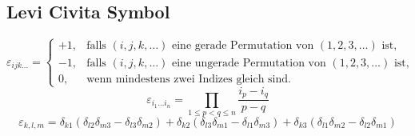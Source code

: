 \documentclass[11pt]{article}
\begin{document}
\subsection{Levi Civita Symbol}
\label{sec-13-3}
\begin{equation}
\varepsilon_{ijk \dots} =
\begin{cases}
+1, & \mbox{falls }(i,j,k,\dots) \mbox{ eine gerade Permutation von } (1,2,3,\dots) \mbox{ ist,} \\
-1, & \mbox{falls }(i,j,k,\dots) \mbox{ eine ungerade Permutation von } (1,2,3,\dots) \mbox{ ist,} \\
0,  & \mbox{wenn mindestens zwei Indizes gleich sind.}
\end{cases}
\end{equation}
\begin{equation}
\varepsilon_{i_1\dots i_n} =
\prod_{1\le p<q\le n} \frac{i_p-i_q}{p-q}
\end{equation}
\begin{equation}
\varepsilon_{k,l,m}=\delta_{k1}(\delta_{l2}\delta_{m3} - \delta_{l3}\delta_{m2}) + \delta_{k2}(\delta_{l3}\delta_{m1} - \delta_{l1}\delta_{m3}) + \delta_{k3}(\delta_{l1}\delta_{m2} - \delta_{l2}\delta_{m1})
\end{equation}
\end{document}
